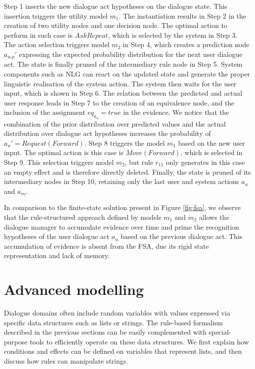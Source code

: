 Step 1 inserts the new dialogue act hypotheses on the dialogue state.  This insertion triggers 
the utility model $m_1$. The instantiation results in Step 2 in the creation of two utility nodes and one decision node.  The optimal action to perform in such case is $\mathit{AskRepeat}$, which is selected by the system in Step 3. The action selection triggers model $m_2$ in Step 4, which creates a prediction node $a_{u\mbox{-}p}'$ expressing the expected probability distribution for the next user dialogue act. The state is finally pruned of the intermediary rule node in Step 5.  System components such as NLG can react on the updated state and generate the proper linguistic realisation of the system action. The system then waits for the user input, which is shown in Step 6.  The relation between the predicted and actual user response leads in Step 7 to the creation of an equivalence node, and the inclusion of the assignment $eq_{a_u} = true$ in the evidence. We notice that the combination of the prior distribution over predicted values and the actual distribution over dialogue act hypotheses increases the probability of $a_u' = \mathit{Request(Forward)}$. Step 8 triggers the model $m_1$ based on the new user input.  The optimal action is this case is $\mathit{Move(Forward)}$, which is selected in Step 9.  This selection triggers model $m_2$, but rule $r_{11}$ only generates in this case an empty effect and is therefore directly deleted. Finally, the state is pruned of its intermediary nodes in Step 10, retaining only the last user and system actions $a_u$ and $a_m$. 

In comparison to the finite-state solution present in Figure \ref{fig:fsa}, we observe that the rule-structured approach defined by models $m_1$ and $m_2$ allows the dialogue manager to 
accumulate evidence over time and prime the recognition hypotheses of the user dialogue act $a_u$ based on the previous dialogue act.  This accumulation of evidence is absent from the FSA, due its rigid state representation and lack of memory. 

\section{Advanced modelling}
\label{sec:amodelling}

Dialogue domains often include random variables with values expressed via specific data structures such as lists or strings. The rule-based formalism described in the previous sections can be easily complemented with special-purpose tools to efficiently operate on these data structures. We first explain how conditions and effects can be defined on variables that represent lists, and then discuss how rules can manipulate strings. 

